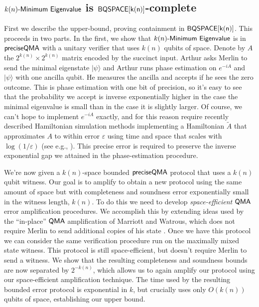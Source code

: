 \documentclass[11pt]{article}
\numberwithin{lemma}{section}
\theoremstyle{definition}
\newcommand\BQSPACE{\sf{BQSPACE}}
\newcommand\preciseQMA{{\sf{preciseQMA}}}
\newcommand\QMA{{\sf{QMA}}}
\renewcommand{\epsilon}{\varepsilon}
\newcommand\spechamiltonian[1]{#1\textit{\sf{-Minimum Eigenvalue}}}
\begin{document}
\subsection{$\spechamiltonian{k(n)}$ is $\BQSPACE[k(n)]$-complete}
First we describe the upper-bound, proving containment in $\BQSPACE[k(n)]$.  This proceeds in two parts.  In the first, we show that $\spechamiltonian{k(n)}$ is in $\preciseQMA$ with a unitary verifier that uses $k(n)$ qubits of space.  Denote by $A$ the $2^{k(n)}\times 2^{k(n)}$ matrix encoded by the succinct input.  Arthur asks Merlin to send the minimal eigenstate $|\psi\rangle$ and Arthur runs phase estimation on $e^{-iA}$ and $|\psi\rangle$ with one ancilla qubit.  He measures the ancilla and accepts if he sees the zero outcome.  This is phase estimation with one bit of precision, so it's easy to see that the probability we accept is inverse exponentially higher in the case the minimal eigenvalue is small than in the case it is slightly larger.  Of course, we can't hope to implement $e^{-iA}$ exactly, and for this reason require recently described Hamiltonian simulation methods implementing a Hamiltonian $\tilde{A}$ that approximates $A$ to within error $\epsilon$ using time and space that scales with $\log{(1/\epsilon)}$ (see e.g., \cite{berry14,berry15}).  This precise error is required to preserve the inverse exponential gap we attained in the phase-estimation procedure.  

We're now given a $k(n)$-space bounded $\preciseQMA$ protocol that uses a $k(n)$ qubit witness.  Our goal is to amplify to obtain a new protocol using the same amount of space but with completeness and soundness error exponentially small in the witness length, $k(n)$.  To do this we need to develop {\emph{space-efficient}} $\QMA$ error amplification procedures.  We accomplish this by extending ideas used by the ``in-place'' $\QMA$ amplification of Marriott and Watrous, which does not require Merlin to send additional copies of his state \cite{mw05}.  Once we have this protocol we can consider the same verification procedure run on the maximally mixed state witness.  This protocol is still space-efficient, but doesn't require Merlin to send a witness.  We show that the resulting completeness and soundness bounds are now separated by $2^{-k(n)}$, which allows us to again amplify our protocol using our space-efficient amplification technique.  The time used by the resulting bounded error protocol is exponential in $k$, but crucially uses only $O(k(n))$ qubits of space, establishing our upper bound.
\end{document}
